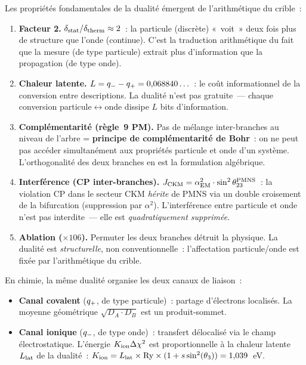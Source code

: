 \documentclass[12pt,a4paper]{article}
\begin{document}
Les propriétés fondamentales de la dualité émergent de
l'arithmétique du crible~:

\begin{enumerate}[nosep]
\item \textbf{Facteur 2.} $\delta_{\rm stat}/\delta_{\rm therm}
  \approx 2$~: la particule (discrète) «~voit~» deux fois plus de
  structure que l'onde (continue). C'est la traduction
  arithmétique du fait que la mesure (de type particule) extrait
  plus d'information que la propagation (de type onde).

\item \textbf{Chaleur latente.} $L = q_{-} - q_{+} = 0{,}068840\ldots$~:
  le coût informationnel de la conversion entre descriptions. La
  dualité n'est pas gratuite~--- chaque conversion
  particule$\leftrightarrow$onde dissipe $L$ bits d'information.

\item \textbf{Complémentarité (règle~9 PM).} Pas de mélange
  inter-branches au niveau de l'arbre = \textbf{principe de
  complémentarité de Bohr}~: on ne peut pas accéder simultanément
  aux propriétés particule et onde d'un système. L'orthogonalité
  des deux branches en est la formulation algébrique.

\item \textbf{Interférence (CP inter-branches).}
  $J_{\rm CKM} = \alpha_{\mathrm{EM}}^2 \cdot \sin^2\theta_{23}^{\rm PMNS}$~:
  la violation CP dans le secteur CKM \emph{hérite} de PMNS via un
  double croisement de la bifurcation (suppression par
  $\alpha^2$). L'interférence entre particule et onde n'est pas
  interdite~--- elle est \emph{quadratiquement supprimée}.

\item \textbf{Ablation ($\times 106$).} Permuter les deux branches
  détruit la physique. La dualité est \emph{structurelle}, non
  conventionnelle~: l'affectation particule/onde est fixée par
  l'arithmétique du crible.
\end{enumerate}

\begin{remarque}
\label{rem:ch9_chemistry_CO}
En chimie, la même dualité organise les deux canaux de liaison~:
\begin{itemize}[nosep]
\item \textbf{Canal covalent} ($q_{+}$, de type particule)~:
  partage d'électrons localisés. La moyenne géométrique
  $\sqrt{D_A \cdot D_B}$ est un produit-sommet.
\item \textbf{Canal ionique} ($q_{-}$, de type onde)~: transfert
  délocalisé via le champ électrostatique. L'énergie
  $K_{\rm ion}\Delta\chi^2$ est proportionnelle à la chaleur
  latente $L_{\rm lat}$ de la dualité~:
  $K_{\rm ion} = L_{\rm lat} \times \mathrm{Ry} \times (1 + s\sin^2(\theta_{3}))
  = 1{,}039$~eV.
\end{itemize}
\end{remarque}
\end{document}
